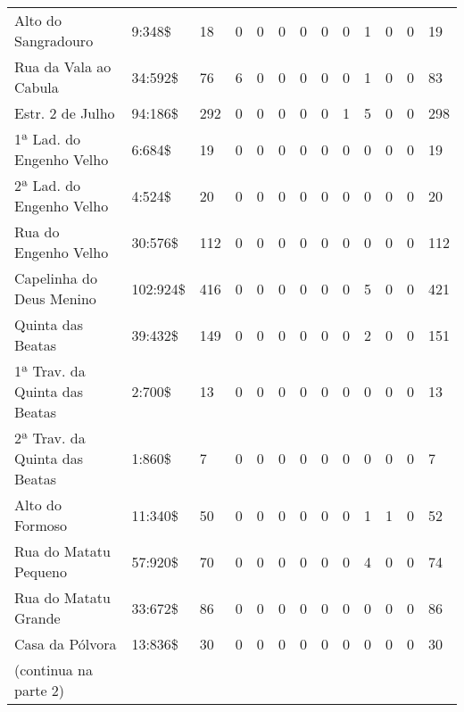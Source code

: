 \begin{sidewaystable}
{\begin{minipage}{\textwidth}
\begin{tiny}
\begin{tabular}{m{3cm} m{1cm} l l l l l l l l l l l}
Alto do Sangradouro						&9:348\$	&18	&0	&0	&0	&0	&0	&0	&1	&0	&0	&19\\
Rua da Vala ao Cabula						&34:592\$	&76	&6	&0	&0	&0	&0	&0	&1	&0	&0	&83\\
Estr. 2 de Julho						&94:186\$	&292	&0	&0	&0	&0	&0	&1	&5	&0	&0	&298\\
1ª Lad. do Engenho Velho					&6:684\$	&19	&0	&0	&0	&0	&0	&0	&0	&0	&0	&19\\
2ª Lad. do Engenho Velho					&4:524\$	&20	&0	&0	&0	&0	&0	&0	&0	&0	&0	&20\\
Rua do Engenho Velho						&30:576\$	&112	&0	&0	&0	&0	&0	&0	&0	&0	&0	&112\\
Capelinha do Deus Menino					&102:924\$	&416	&0	&0	&0	&0	&0	&0	&5	&0	&0	&421\\
Quinta das Beatas						&39:432\$	&149	&0	&0	&0	&0	&0	&0	&2	&0	&0	&151\\
1ª Trav. da Quinta das Beatas				&2:700\$	&13	&0	&0	&0	&0	&0	&0	&0	&0	&0	&13\\
2ª Trav. da Quinta das Beatas				&1:860\$	&7	&0	&0	&0	&0	&0	&0	&0	&0	&0	&7\\
Alto do Formoso							&11:340\$	&50	&0	&0	&0	&0	&0	&0	&1	&1	&0	&52\\
Rua do Matatu Pequeno						&57:920\$	&70	&0	&0	&0	&0	&0	&0	&4	&0	&0	&74\\
Rua do Matatu Grande						&33:672\$	&86	&0	&0	&0	&0	&0	&0	&0	&0	&0	&86\\
Casa da Pólvora							&13:836\$	&30	&0	&0	&0	&0	&0	&0	&0	&0	&0	&30\\
\bottomrule
(continua na parte 2) & & & & & & & & & & & & \\
\end{tabular} 
\end{tiny}
\end{minipage}
}
{}
\end{sidewaystable}